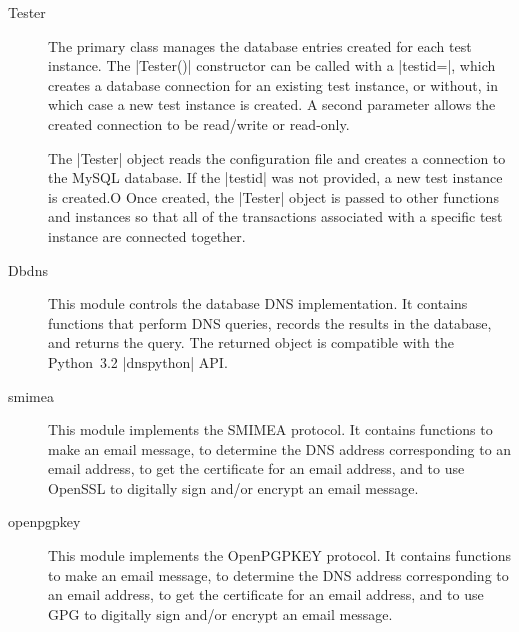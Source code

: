 \documentclass[preprint,3p,11pt]{elsarticle}
\begin{document}
\begin{description}
\item[Tester] The primary class manages the database entries
created for each test instance. The |Tester()| constructor can be
called with a |testid=|, which creates a database connection for an
existing test instance, or without, in which case a new test instance
is created. A second parameter allows the created connection to be
read/write or read-only.

The |Tester| object reads the configuration file and creates a
connection to the MySQL database. If the |testid| was not provided, a
new test instance is created.O Once created, the |Tester| object is
passed to other functions and instances so that all of the
transactions associated with a specific test instance are connected
together.

\item[Dbdns] This module controls the database DNS
implementation. It contains functions that perform DNS queries,
records the results in the database, and returns the query. The
returned object  is compatible with the Python~3.2 |dnspython| API.

\item[smimea] This module implements the SMIMEA protocol. It contains
  functions to make an email message, to determine the DNS address
  corresponding to an email address, to get the certificate for an
  email address, and to use OpenSSL to digitally sign and/or encrypt
  an email message.

\item[openpgpkey] This module implements the OpenPGPKEY protocol. It contains
  functions to make an email message, to determine the DNS address
  corresponding to an email address, to get the certificate for an
  email address, and to use GPG to digitally sign and/or encrypt
  an email message.

\end{description}
\end{document}
